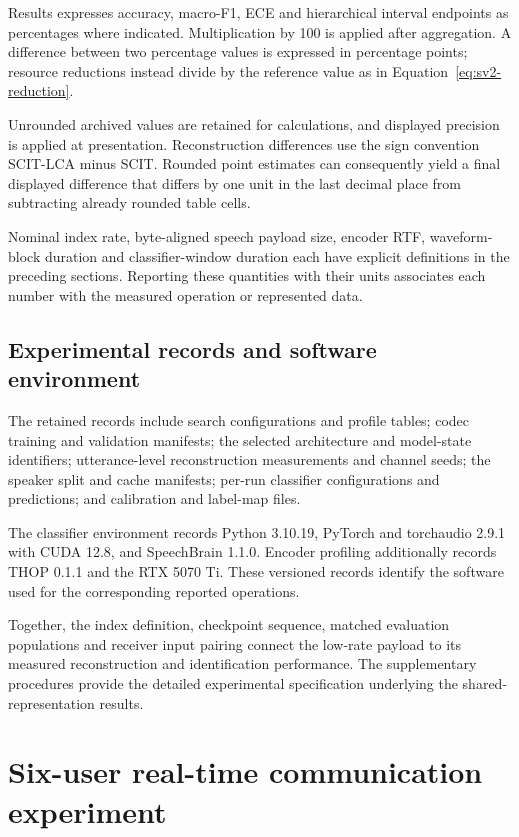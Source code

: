 Results expresses accuracy, macro-F1, ECE and hierarchical interval endpoints as percentages where indicated. Multiplication by 100 is applied after aggregation. A difference between two percentage values is expressed in percentage points; resource reductions instead divide by the reference value as in Equation~\ref{eq:sv2-reduction}.

Unrounded archived values are retained for calculations, and displayed precision is applied at presentation. Reconstruction differences use the sign convention SCIT-LCA minus SCIT. Rounded point estimates can consequently yield a final displayed difference that differs by one unit in the last decimal place from subtracting already rounded table cells.

Nominal index rate, byte-aligned speech payload size, encoder RTF, waveform-block duration and classifier-window duration each have explicit definitions in the preceding sections. Reporting these quantities with their units associates each number with the measured operation or represented data.

\subsection{Experimental records and software environment}
The retained records include search configurations and profile tables; codec training and validation manifests; the selected architecture and model-state identifiers; utterance-level reconstruction measurements and channel seeds; the speaker split and cache manifests; per-run classifier configurations and predictions; and calibration and label-map files.

The classifier environment records Python 3.10.19, PyTorch and torchaudio 2.9.1 with CUDA 12.8, and SpeechBrain 1.1.0. Encoder profiling additionally records THOP 0.1.1 and the RTX 5070 Ti. These versioned records identify the software used for the corresponding reported operations.

Together, the index definition, checkpoint sequence, matched evaluation populations and receiver input pairing connect the low-rate payload to its measured reconstruction and identification performance. The supplementary procedures provide the detailed experimental specification underlying the shared-representation results.

\section{Six-user real-time communication experiment}
\label{sec:sv3-six-user-system}

